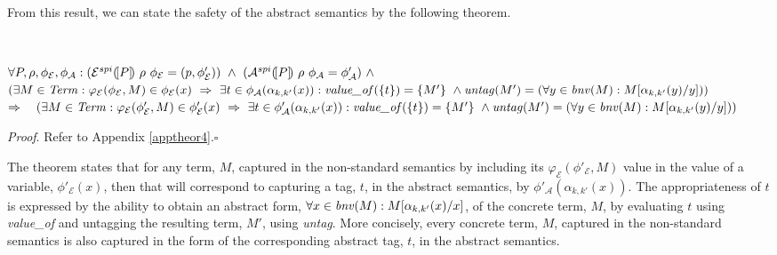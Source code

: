 \documentclass[10pt,a4paper,final,oneside,fleqn]{book}
\begin{document}
From this result, we can state the safety of the abstract semantics by the following theorem.
\begin{theor}\label{theor4}
$ $

\noindent
$\forall P,\rho,\phi_\mathcal{E},\phi_\mathcal{A}:\\
(\mathcal{E}^{spi}(\![P]\!)~\rho~\phi_\mathcal{E}=(p,\phi'_\mathcal{E}))~\wedge~(\mathcal{A}^{spi}(\![P]\!)~\rho~\phi_\mathcal{A}=\phi'_\mathcal{A})~\wedge$\\
$(\exists M\in\mbox{{\itshape Term\/}}:\varphi_\mathcal{E}(\phi_\mathcal{E},M)\in\phi_\mathcal{E}(x)~\Rightarrow~\exists t\in\phi_\mathcal{A}(\alpha_{k,k'}(x)):\mbox{{\itshape value\_of\/}}(\{t\})=\{M'\}~\wedge\hfill\mbox{{\itshape untag\/}}(M')=(\forall y\in\mbox{{\itshape bnv\/}}(M):M[\alpha_{k,k'}(y)/y]))$\\
$\Rightarrow~~~(\exists M\in\mbox{{\itshape Term\/}}:\varphi_\mathcal{E}(\phi'_\mathcal{E},M)\in\phi'_\mathcal{E}(x)~\Rightarrow~\exists t\in\phi'_\mathcal{A}(\alpha_{k,k'}(x)): \mbox{{\itshape value\_of\/}}(\{t\})=\{M'\}~\wedge\hfill\mbox{{\itshape untag\/}}(M')=(\forall y\in\mbox{{\itshape bnv\/}}(M):M[\alpha_{k,k'}(y)/y]))$
\end{theor}

\noindent
{\itshape Proof\/}. Refer to Appendix \ref{apptheor4}.\hfill$\square$

The theorem states that for any term, $M$, captured in the non-standard semantics by including its $\varphi_\mathcal{E}(\phi'_\mathcal{E},M)$ value in the value of a variable, $\phi'_\mathcal{E}(x)$, then that will correspond to capturing a tag, $t$, in the abstract semantics, by $\phi'_\mathcal{A}(\alpha_{k,k'}(x))$.  The appropriateness of $t$ is expressed by the ability to obtain an abstract form, 
$\forall x\in\mbox{{\itshape bnv\/}}(M):M[\alpha_{k,k'}(x)/x]$, of the concrete term, $M$, by evaluating $t$ using {\itshape value\_of\/} and untagging the resulting term, $M'$, using {\itshape untag\/}.  More concisely, every concrete term, $M$, captured in the non-standard semantics is also captured in the form of the corresponding abstract tag, $t$, in the abstract semantics.
\end{document}
